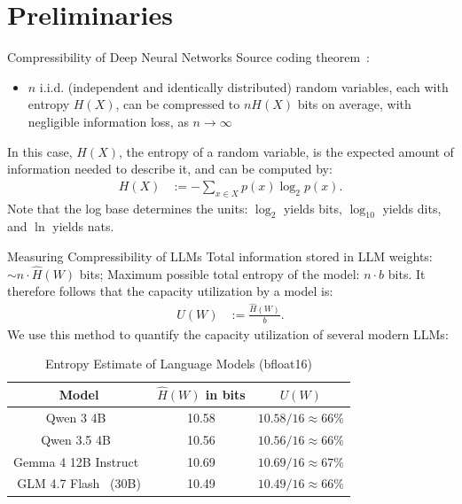 \documentclass{beamer}
\begin{document}
\section{Preliminaries}
\begin{frame}{Compressibility of Deep Neural Networks}
Source coding theorem~\cite{shannonInformationTheory}:
\begin{itemize}
    \item $n$ i.i.d. (independent and identically distributed) random variables, each with entropy $H(X)$, can be compressed to $nH(X)$ bits on average, with negligible information loss, as $n \rightarrow \infty$ 
\end{itemize}
In this case, $H(X)$, the entropy of a random variable, is the expected amount of information needed to describe it, and can be computed by:
\begin{align}
H(X)&:=-\sum_{x\in X}p(x)\log_2 p(x).
\end{align}
Note that the log base determines the units: $\log_2$ yields bits, $\log_{10}$ yields dits, and $\ln$ yields nats.
\end{frame}
\begin{frame}{Measuring Compressibility of LLMs}
Total information stored in LLM weights: $\sim n \cdot \hat{H}(W)$ bits; Maximum possible total entropy of the model: $n\cdot b$ bits. It therefore follows that the capacity utilization by a model is:
\begin{align}
U(W) &:= \frac{\hat{H}(W)}{b}.
\end{align}
We use this method to quantify the capacity utilization of several modern LLMs:

\begin{table}
\centering
\caption{Entropy Estimate of Language Models (bfloat16)}
\label{tab:bf16_entropy}
\begin{tabular}{|c|c|c|}
 \hline
    Model & $\hat{H}(W)$ in bits & $U(W)$ \\ \hline
    Qwen 3 4B~\cite{yangQwen3TechnicalReport2025b} & 10.58 & $10.58/16\approx66\%$ \\ \hline
    Qwen 3.5 4B~\cite{teamQwen35AcceleratingProductivity2026} & 10.56 &  $10.56/16\approx66\%$ \\ \hline
    Gemma 4 12B Instruct~\cite{teamGemma4Technical2026}& 10.69 & $10.69/16\approx67\%$ \\ \hline
    GLM 4.7 Flash~\cite{z.aiinc.GLM47AdvancingCoding2025} (30B)& 10.49 & $10.49/16\approx66\%$ \\ \hline
\end{tabular}
\end{table}
\end{frame}
\end{document}
